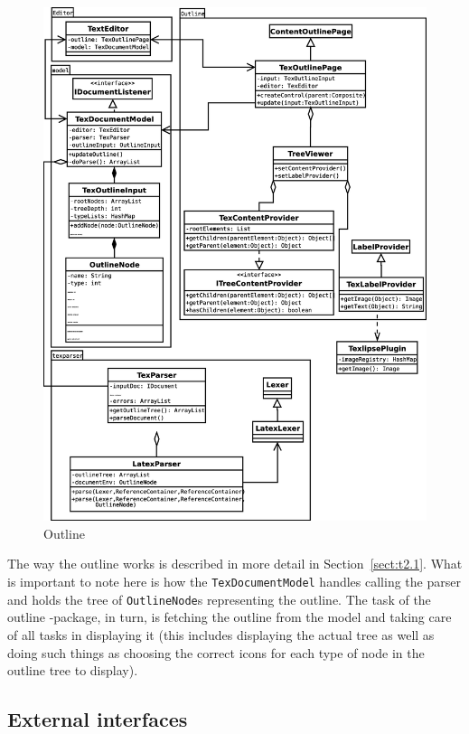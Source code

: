 \documentclass[a4paper,11pt,twoside]{article}
\begin{document}
\begin{figure}[!htp]
\begin{center}
\includegraphics[width=12cm]{images/outline}
\caption{Outline}
\label{fig:outline}
\end{center}
\end{figure}

The way the outline works is described in more detail in 
Section~\ref{sect:t2.1}. What is important to note here is how the 
\texttt{TexDocumentModel} handles calling the parser and holds the tree of 
\texttt{OutlineNode}s representing the outline. The task of the 
outline -package, in turn, is fetching the outline from the model and taking 
care of all tasks in displaying it (this includes displaying the actual tree as 
well as doing such things as choosing the correct icons for each type of node 
in the outline tree to display).


\subsection{External interfaces}
\end{document}

